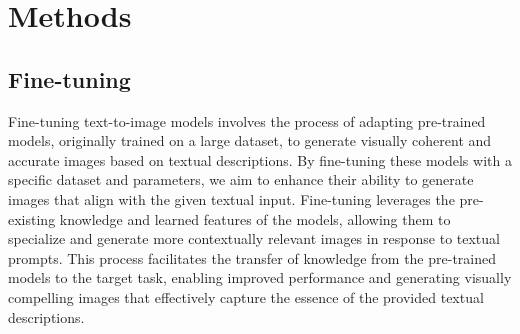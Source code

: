 \documentclass[conference]{IEEEtran}
\begin{document}
\section{Methods}

\subsection{Fine-tuning}
Fine-tuning text-to-image models involves the process of adapting pre-trained models, originally trained on a large dataset, to generate visually coherent and accurate images based on textual descriptions. By fine-tuning these models with a specific dataset and parameters, we aim to enhance their ability to generate images that align with the given textual input. Fine-tuning leverages the pre-existing knowledge and learned features of the models, allowing them to specialize and generate more contextually relevant images in response to textual prompts. This process facilitates the transfer of knowledge from the pre-trained models to the target task, enabling improved performance and generating visually compelling images that effectively capture the essence of the provided textual descriptions.
\end{document}
